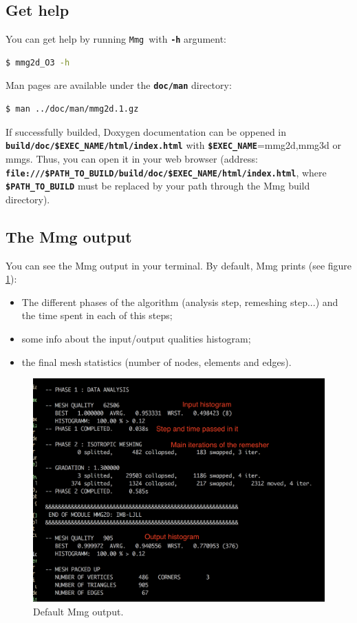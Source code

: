 \documentclass{article}
\newcommand{\ttb}[1]{\texttt{\textbf{#1}}}
\newcommand{\mmg}{\texttt{Mmg}}
\begin{document}
\subsection{Get help}
You can get help by running \mmg\ with \ttb{-h} argument:
\begin{lstlisting}[language=bash]
$ mmg2d_O3 -h
\end{lstlisting}

Man pages are available under the \ttb{doc/man} directory:
\begin{lstlisting}[language=bash]
$ man ../doc/man/mmg2d.1.gz
\end{lstlisting}

If successfully builded, Doxygen documentation can be oppened in
\ttb{build/doc/\$EXEC\_NAME/html/index.html} with
\ttb{\$EXEC\_NAME}=mmg2d,mmg3d or mmgs. Thus, you can open it in your
web browser (address: \ttb{file:///\$PATH\_TO\_BUILD/build/doc/\$EXEC\_NAME/html/index.html},
where \ttb{\$PATH\_TO\_BUILD} must be replaced by your path through
the Mmg build directory).

\subsection{The Mmg output}
You can see the Mmg output in your terminal. By default, Mmg prints (see figure \ref{mmg_konsole}):
\begin{itemize}
\item The different phases of the algorithm (analysis step, remeshing
  step...) and the time spent in each of this steps;
\item some info about the input/output qualities histogram;
\item the final mesh statistics (number of nodes, elements and edges).
\end{itemize}
\begin{figure}
\centering
\includegraphics[width=0.8\linewidth]{mmg_konsole}
\caption{\label{mmg_konsole}
Default Mmg output.}
\end{figure}
\end{document}
